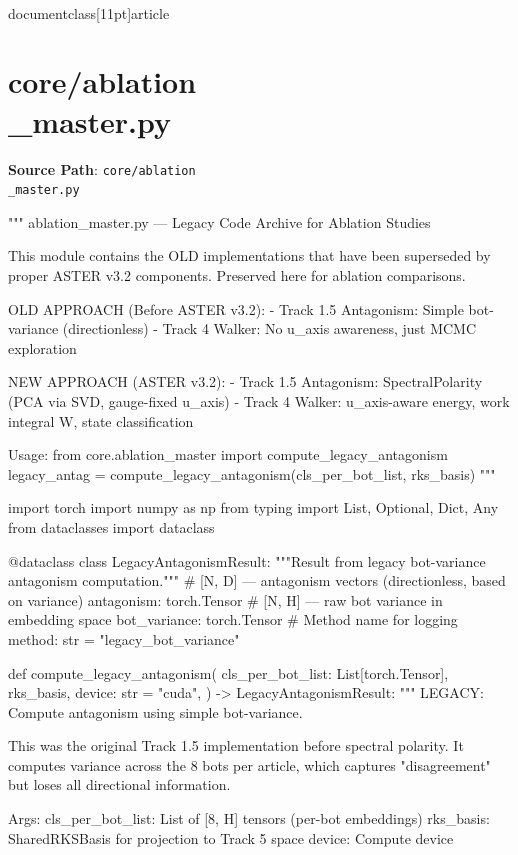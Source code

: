\\documentclass[11pt]{article}
\begin{document}
\section*{core/ablation\\_master.py}
\textbf{Source Path}: \texttt{core/ablation\\_master.py}\par
\bigskip
\begin{CodeBlock}
"""
ablation_master.py — Legacy Code Archive for Ablation Studies

This module contains the OLD implementations that have been superseded by
proper ASTER v3.2 components. Preserved here for ablation comparisons.

OLD APPROACH (Before ASTER v3.2):
- Track 1.5 Antagonism: Simple bot-variance (directionless)
- Track 4 Walker: No u_axis awareness, just MCMC exploration

NEW APPROACH (ASTER v3.2):
- Track 1.5 Antagonism: SpectralPolarity (PCA via SVD, gauge-fixed u_axis)
- Track 4 Walker: u_axis-aware energy, work integral W, state classification

Usage:
    from core.ablation_master import compute_legacy_antagonism
    legacy_antag = compute_legacy_antagonism(cls_per_bot_list, rks_basis)
"""

import torch
import numpy as np
from typing import List, Optional, Dict, Any
from dataclasses import dataclass


@dataclass
class LegacyAntagonismResult:
    """Result from legacy bot-variance antagonism computation."""
    # [N, D] — antagonism vectors (directionless, based on variance)
    antagonism: torch.Tensor
    # [N, H] — raw bot variance in embedding space
    bot_variance: torch.Tensor
    # Method name for logging
    method: str = "legacy_bot_variance"


def compute_legacy_antagonism(
    cls_per_bot_list: List[torch.Tensor],
    rks_basis,
    device: str = "cuda",
) -> LegacyAntagonismResult:
    """
    LEGACY: Compute antagonism using simple bot-variance.

    This was the original Track 1.5 implementation before spectral polarity.
    It computes variance across the 8 bots per article, which captures
    "disagreement" but loses all directional information.

    Args:
        cls_per_bot_list: List of [8, H] tensors (per-bot embeddings)
        rks_basis: SharedRKSBasis for projection to Track 5 space
        device: Compute device


\end{CodeBlock}
\end{document}

